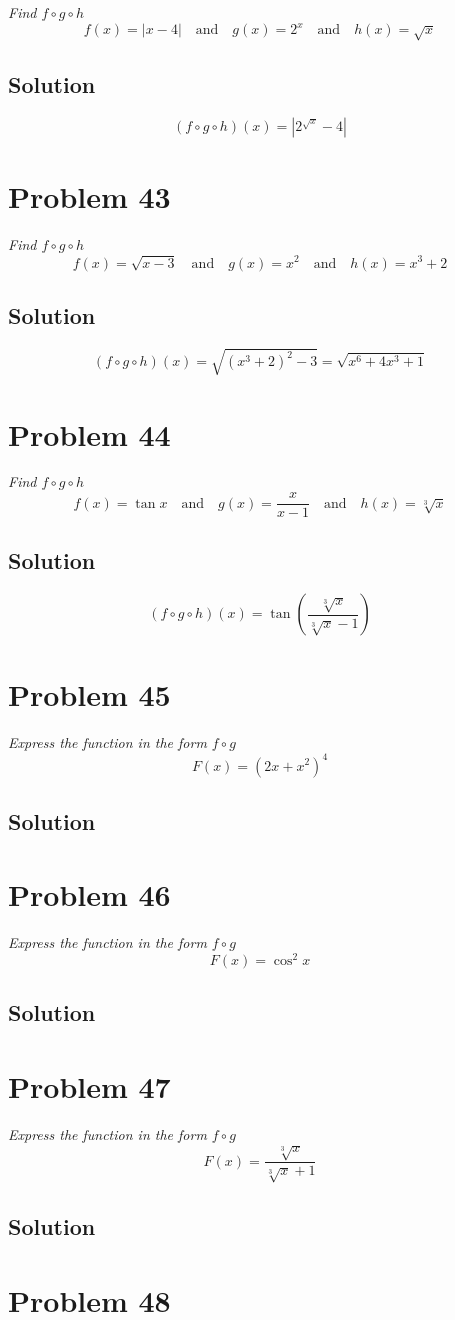 \documentclass[11pt]{article}
\newcommand{\soln}{\subsection*}
\newcommand{\qn}{\textit}
\begin{document}
\qn{Find $f \circ g \circ h$ $$f(x)=|x-4| \quad \text{and} \quad g(x)=2^x \quad \text{and} \quad h(x)=\sqrt{x}$$}

\soln{Solution}
$$(f \circ g \circ h)(x)=|2^{\sqrt{x}}-4|$$

\section*{Problem 43}

\qn{Find $f \circ g \circ h$ $$f(x)=\sqrt{x-3} \quad \text{and} \quad g(x)=x^2 \quad \text{and} \quad h(x)=x^3+2$$}

\soln{Solution}
$$(f \circ g \circ h)(x)=\sqrt{(x^3+2)^2-3}=\sqrt{x^6+4x^3+1}$$

\section*{Problem 44}

\qn{Find $f \circ g \circ h$ $$f(x)=\tan{x} \quad \text{and} \quad g(x)=\frac{x}{x-1} \quad \text{and} \quad h(x)=\sqrt[3]{x}$$}

\soln{Solution}
$$(f \circ g \circ h)(x)=\tan(\frac{\sqrt[3]{x}}{\sqrt[3]{x}-1})$$

\section*{Problem 45}

\qn{Express the function in the form $f \circ g$ $$F(x)=(2x+x^2)^4$$}

\soln{Solution}

\section*{Problem 46}

\qn{Express the function in the form $f \circ g$ $$F(x)=\cos^2{x}$$}

\soln{Solution}

\section*{Problem 47}

\qn{Express the function in the form $f \circ g$ $$F(x)=\frac{\sqrt[3]{x}}{\sqrt[3]{x}+1}$$}

\soln{Solution}

\section*{Problem 48}
\end{document}
